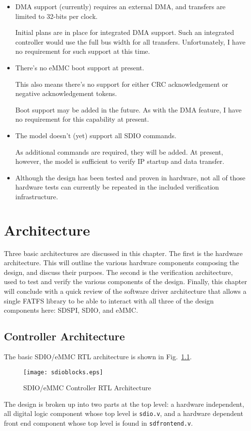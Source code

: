 \documentclass{gqtekspec}
\begin{document}
\begin{itemize}
\item DMA support (currently) requires an external DMA, and transfers are
	limited to 32-bits per clock.

	Initial plans are in place for integrated DMA support.  Such an
	integrated controller would use the full bus width for all transfers.
	Unfortunately, I have no requirement for such support at this time.

\item There's no eMMC boot support at present.

	This also means there's no support for either CRC acknowledgement
	or negative acknowledgement tokens.

	Boot support may be added in the future.  As with the DMA feature,
	I have no requirement for this capability at present.

\item The model doesn't (yet) support all SDIO commands.

	As additional commands are required, they will be added.  At present,
	however, the model is sufficient to verify IP startup and data
	transfer.

\item Although the design has been tested and proven in hardware, not all
	of those hardware tests can currently be repeated in the included
	verification infrastructure.
\end{itemize}
\chapter{Architecture}\label{ch:arch}
Three basic architectures are discussed in this chapter.  The first is the
hardware architecture.  This will outline the various hardware components
composing the design, and discuss their purpoes.  The second is the verification
architecture, used to test and verify the various components of the design.
Finally, this chapter will conclude with a quick review of the software driver
architecture that allows a single FATFS library to be able to interact with
all three of the design components here: SDSPI, SDIO, and eMMC.

\section{Controller Architecture}\label{sec:arch-controller}

The basic SDIO/eMMC RTL architecture is shown in Fig.~\ref{fig:sdioblocks}.
\begin{figure}\begin{center}
\texttt{[image: sdioblocks.eps]}
\caption{SDIO/eMMC Controller RTL Architecture}\label{fig:sdioblocks}
\end{center}\end{figure}
The design is broken up into two parts at the top level: a hardware independent,
all digital logic component whose top level is {\tt sdio.v}, and a hardware
dependent front end component whose top level is found in {\tt sdfrontend.v}.
\end{document}
